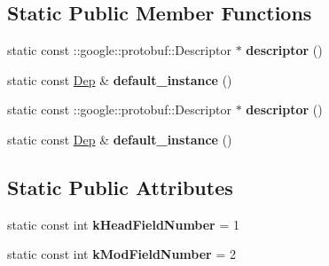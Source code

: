 \subsection*{Static Public Member Functions}
\begin{DoxyCompactItemize}
\item 
\hypertarget{classDep_a29bfc132af3268c281ed5b2bfb7e09b5}{
static const ::google::protobuf::Descriptor $\ast$ {\bfseries descriptor} ()}
\label{classDep_a29bfc132af3268c281ed5b2bfb7e09b5}

\item 
\hypertarget{classDep_a81ccd4891740b599546e7e52c04ca516}{
static const \hyperlink{classDep}{Dep} \& {\bfseries default\_\-instance} ()}
\label{classDep_a81ccd4891740b599546e7e52c04ca516}

\item 
\hypertarget{classDep_a29bfc132af3268c281ed5b2bfb7e09b5}{
static const ::google::protobuf::Descriptor $\ast$ {\bfseries descriptor} ()}
\label{classDep_a29bfc132af3268c281ed5b2bfb7e09b5}

\item 
\hypertarget{classDep_a81ccd4891740b599546e7e52c04ca516}{
static const \hyperlink{classDep}{Dep} \& {\bfseries default\_\-instance} ()}
\label{classDep_a81ccd4891740b599546e7e52c04ca516}

\end{DoxyCompactItemize}
\subsection*{Static Public Attributes}
\begin{DoxyCompactItemize}
\item 
\hypertarget{classDep_a30b9f1997de8bc996e1b0e1d5220dd99}{
static const int {\bfseries kHeadFieldNumber} = 1}
\label{classDep_a30b9f1997de8bc996e1b0e1d5220dd99}

\item 
\hypertarget{classDep_acb384371c72fcc36536bdb88a88cd05a}{
static const int {\bfseries kModFieldNumber} = 2}
\label{classDep_acb384371c72fcc36536bdb88a88cd05a}

\end{DoxyCompactItemize}

